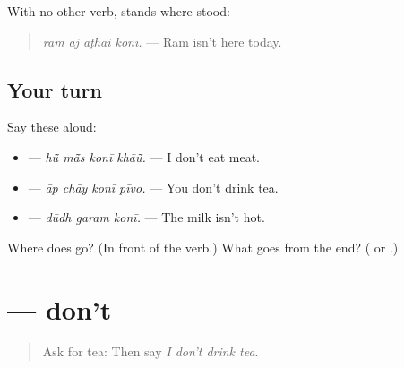 \begin{grammarlens}[title={Grammar Lens: \mw{कोनी} in place of \mw{है}}]
With no other verb, \textbf{} stands where \textbf{} stood:

\begin{quote}
\textbf{   }
\end{quote}

\begin{quote}
\emph{rām āj aṭhai konī.} — Ram isn't here today.
\end{quote}
\end{grammarlens}

\subsection*{Your turn}
Say these aloud:

\begin{itemize}
\raggedright
  \item \textbf{   } — \emph{hū̃ mā̃s konī khāū̃.} — I don't eat meat.
  \item \textbf{   } — \emph{āp chāy konī pīvo.} — You don't drink tea.
  \item \textbf{  } — \emph{dūdh garam konī.} — The milk isn't hot.
\end{itemize}

\begin{tcolorbox}[breakable,colback=teal!4,colframe=teal!35!black,title={Before you move on}]
Where does \textbf{} go? (In front of the verb.) What goes from the end? (\textbf{} or \textbf{}.)
\end{tcolorbox}
\section[\texorpdfstring{\mw{मत} (mat)}{मत (mat)}]{ — don't}

\label{lesson:MW-C157-mat}



\begin{quote}
Ask for tea: \textbf{ } Then say \emph{I don't drink tea}.
\end{quote}

